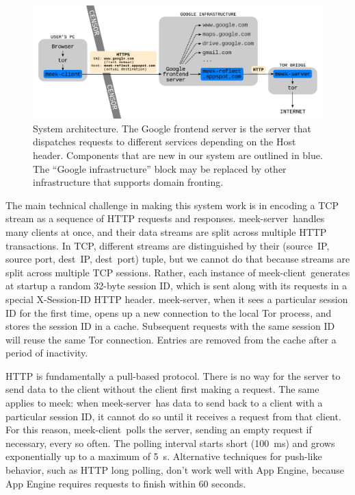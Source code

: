 \documentclass{article}
\def\meekclient{\mbox{meek-client}}
\def\meekserver{\mbox{meek-server}}
\begin{document}
\begin{figure}
\centering
\includegraphics[width=\linewidth]{architecture}
\caption{
System architecture.
The Google frontend server is the server that dispatches requests to different services depending on the Host header.
Components that are new in our system are outlined in blue.
The ``Google infrastructure'' block may be replaced by other infrastructure that supports domain fronting.
}
\label{fig:architecture}
\end{figure}

The main technical challenge in making this system work
is in encoding a TCP stream as a sequence of HTTP requests and responses.
\meekserver\ handles many clients at once, and their data streams
are split across multiple HTTP transactions.
In TCP, different streams are distinguished by their
(source~IP, source port, dest~IP, dest~port) tuple,
but we cannot do that because streams are split across multiple TCP sessions.
Rather, each instance of \meekclient\ generates at startup a random 32-byte
session ID, which is sent along with its requests in a special
X-Session-ID HTTP header.
\meekserver, when it sees a particular session ID for the first time,
opens up a new connection to the local Tor process,
and stores the session ID in a cache. Subsequent requests with the
same session ID will reuse the same Tor connection.
Entries are removed from the cache after a period of inactivity.

HTTP is fundamentally a pull-based protocol.
There is no way for the server to send data to the client without
the client first making a request.
The same applies to meek: when \meekserver\ has data to send back to
a client with a particular session ID, it cannot do so until it
receives a request from that client.
For this reason, \meekclient\ polls the server,
sending an empty request if necessary, every so often.
The polling interval starts short (100~ms) and grows exponentially
up to a maximum of 5~s.
Alternative techniques for push-like behavior,
such as HTTP long polling,
don't work well with App Engine,
because App Engine requires requests to finish within 60 seconds.
\end{document}
